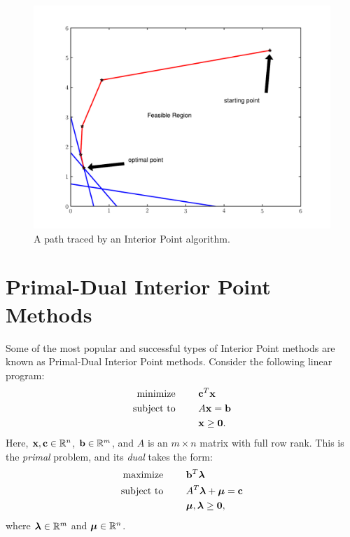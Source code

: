 \begin{figure}
\centering
\includegraphics[width=\textwidth]{interiorPath.pdf}
\caption{A path traced by an Interior Point algorithm.}
\label{fig:intPath}
\end{figure}

\section*{Primal-Dual Interior Point Methods} %
Some of the most popular and successful types of Interior Point methods are known as Primal-Dual Interior Point methods.
Consider the following linear program:
\begin{align*}
\text{minimize }\qquad &\mathbf{c}^T\mathbf{x}\\
\text{subject to }\qquad &A\mathbf{x} = \mathbf{b}\\
&\mathbf{x} \geq \mathbf{0}.
\end{align*}
Here, $\mathbf{x}, \mathbf{c} \in \mathbb{R}^n$, $\mathbf{b} \in \mathbb{R}^m$, and $A$ is an $m \times n$ matrix with full row rank.
This is the \emph{primal} problem, and its \emph{dual} takes the form:
\begin{align*}
\text{maximize }\qquad &\mathbf{b}^T\boldsymbol{\lambda}\\
\text{subject to }\qquad &A^T\boldsymbol{\lambda} + \boldsymbol{\mu} = \mathbf{c}\\
&\boldsymbol{\mu},\boldsymbol{\lambda} \geq \mathbf{0},
\end{align*}
where $\boldsymbol{\lambda} \in \mathbb{R}^m$ and $\boldsymbol{\mu} \in \mathbb{R}^n$.

